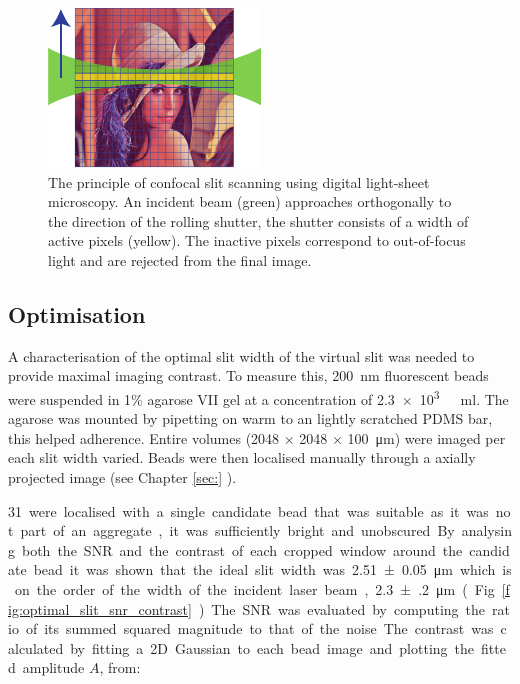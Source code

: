 \begin{figure}
  \centering
  \includegraphics{slit_scanning_alt}
  \caption{The principle of confocal slit scanning using digital light-sheet microscopy.
  An incident beam (green) approaches orthogonally to the direction of the rolling shutter, the shutter consists of a width of active pixels (yellow).
  The inactive pixels correspond to out-of-focus light and are rejected from the final image.}
  \label{fig:slit_scanning_alt}
\end{figure}

\subsection{Optimisation}

A characterisation of the optimal slit width of the virtual slit was needed to provide maximal imaging contrast.
To measure this, \SI{200}{\nano\metre} fluorescent beads were suspended in 1\% agarose VII gel at a concentration of \SI{2.3e3}{ \per\milli\litre}.
The agarose was mounted by pipetting on warm to an lightly scratched PDMS bar, this helped adherence.
Entire volumes (2048 $\times$ 2048 $\times$ \SI{100}{\micro\metre}) were imaged per each slit width varied.
Beads were then localised manually through a axially projected image (see Chapter \ref{sec:} %
).

\SI{31} were localised with a single candidate bead that was suitable as it was not part of an aggregate, it was sufficiently bright and unobscured.
By analysing both the SNR and the contrast of each cropped window around the candidate bead it was shown that the ideal slit width was \SI{2.51(5)}{\micro\metre} which is on the order of the width of the incident laser beam, \SI{2.3(2)}{\micro\metre} (Fig. \ref{fig:optimal_slit_snr_contrast}).
The SNR was evaluated by computing the ratio of its summed squared magnitude to that of the noise.
The contrast was calculated by fitting a 2D Gaussian to each bead image and plotting the fitted amplitude $A$, from:

